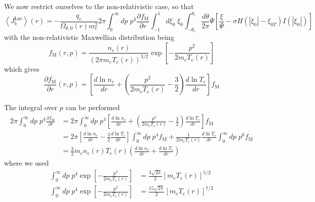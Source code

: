 We now restrict ourselves to the non-relativistic case, so that%
\begin{equation}
\left\langle J_{b}^{\text{Lnr}}\right\rangle \left(  r\right)  =-\frac{q_{e}%
}{\Omega_{\theta,0}\left(  r\right)  m_{e}^{2}}2\pi\int_{0}^{\infty}%
dp\;p^{4}\frac{\partial f_{\text{M}}}{\partial r}\int_{-1}^{1}d\xi_{0}%
\;\xi_{0}\int_{-\theta_{c}}^{\theta_{c}}\frac{d\theta}{2\pi}\Psi\left[
\frac{\xi}{\Psi}-\sigma H\left(  \left|  \xi_{0}\right|  -\xi_{0T}\right)
I\left(  \left|  \xi_{0}\right|  \right)  \right]
\end{equation}
with the non-relativistic Maxwellian distribution being%
\begin{equation}
f_{\text{M}}\left(  r,p\right)  =\frac{n_{e}\left(  r\right)  }{\left(  2\pi
m_{e}T_{e}\left(  r\right)  \right)  ^{3/2}}\exp\left[  -\frac{p^{2}}%
{2m_{e}T_{e}\left(  r\right)  }\right]
\end{equation}
which gives%
\begin{equation}
\frac{\partial f_{\text{M}}}{\partial r}\left(  r,p\right)  =\left[
\frac{d\ln n_{e}}{dr}+\left(  \frac{p^{2}}{2m_{e}T_{e}\left(  r\right)
}-\frac{3}{2}\right)  \frac{d\ln T_{e}}{dr}\right]  f_{\text{M}}%
\end{equation}

The integral over $p$ can be performed%
\begin{align}
2\pi\int_{0}^{\infty}dp\;p^{4}\frac{\partial f_{\text{M}}}{\partial r}  &
=2\pi\int_{0}^{\infty}dp\;p^{4}\left[  \frac{d\ln n_{e}}{dr}+\left(
\frac{p^{2}}{2m_{e}T_{e}\left(  r\right)  }-\frac{3}{2}\right)  \frac{d\ln
T_{e}}{dr}\right]  f_{\text{M}}\nonumber\\
&  =2\pi\left[  \frac{d\ln n_{e}}{dr}-\frac{3}{2}\frac{d\ln T_{e}}{dr}\right]
\int_{0}^{\infty}dp\;p^{4}f_{\text{M}}+\frac{1}{2m_{e}T_{e}\left(  r\right)
}\frac{d\ln T_{e}}{dr}\int_{0}^{\infty}dp\;p^{6}f_{\text{M}}\nonumber\\
&  =\frac{3}{2}m_{e}n_{e}\left(  r\right)  T_{e}\left(  r\right)  \left(
\frac{d\ln n_{e}}{dr}+\frac{d\ln T_{e}}{dr}\right)
\end{align}
where we used%
\begin{align}
\int_{0}^{\infty}dp\;p^{4}\exp\left[  -\frac{p^{2}}{2m_{e}T_{e}\left(
r\right)  }\right]   &  =\frac{3\sqrt{2\pi}}{2}\left[  m_{e}T_{e}\left(
r\right)  \right]  ^{5/2}\\
\int_{0}^{\infty}dp\;p^{4}\exp\left[  -\frac{p^{2}}{2m_{e}T_{e}\left(
r\right)  }\right]   &  =\frac{15\sqrt{2\pi}}{2}\left[  m_{e}T_{e}\left(
r\right)  \right]  ^{7/2}\nonumber
\end{align}

